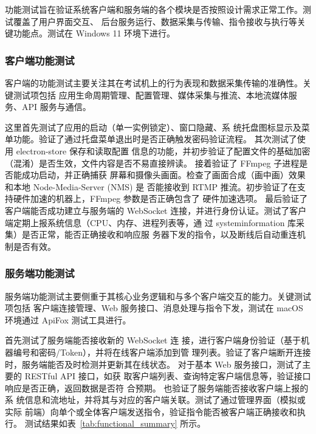 功能测试旨在验证系统客户端和服务端的各个模块是否按照设计需求正常工作。测试覆盖了用户界面交互、
后台服务运行、数据采集与传输、指令接收与执行等关键功能点。测试在 Windows 11 环境下进行。


\subsubsection{客户端功能测试}

客户端的功能测试主要关注其在考试机上的行为表现和数据采集传输的准确性。关键测试项包括
应用生命周期管理、配置管理、媒体采集与推流、本地流媒体服务、API 服务与通信。

这里首先测试了应用的启动（单一实例锁定）、窗口隐藏、系
统托盘图标显示及菜单功能。验证了通过托盘菜单退出时是否正确触发密码验证流程。
其次测试了使用 electron-store 保存和读取配置
信息的功能，并初步验证了配置文件的基础加密（混淆）是否生效，文件内容是否不易直接辨读。
接着验证了 FFmpeg 子进程是否能成功启动，并正确捕获
屏幕和摄像头画面。检查了画面合成（画中画）效果和本地 Node-Media-Server (NMS) 是
否能接收到 RTMP 推流。初步验证了在支持硬件加速的机器上，FFmpeg 参数是否正确包含了
硬件加速选项。
最后验证了客户端能否成功建立与服务端的 WebSocket 
连接，并进行身份认证。测试了客户端定期上报系统信息（CPU、内存、进程列表等，通
过 systeminformation 库采集）是否正常，能否正确接收和响应服
务器下发的指令，以及断线后自动重连机制是否有效。

\subsubsection{服务端功能测试}

服务端功能测试主要侧重于其核心业务逻辑和与多个客户端交互的能力。关键测试项包括
客户端连接管理、Web 服务接口、消息处理与指令下发，测试在 macOS 环境通过 ApiFox 测试工具进行。


首先测试了服务端能否接收新的 WebSocket 连
接，进行客户端身份验证（基于机器编号和密码/Token），并将在线客户端添加到管
理列表。验证了客户端断开连接时，服务端能否及时检测并更新其在线状态。
对于基本 Web 服务接口，测试了主要的 RESTful API 接口，如获
取客户端列表、查询特定客户端信息等，验证接口响应是否正确，返回数据是否符
合预期。
也验证了服务端能否接收客户端上报的系
统信息和流地址，并将其与对应的客户端关联。测试了通过管理界面（模拟或实际
前端）向单个或全体客户端发送指令，验证指令能否被客户端正确接收和执行。
测试结果如表~\ref{tab:functional_summary} 所示。

